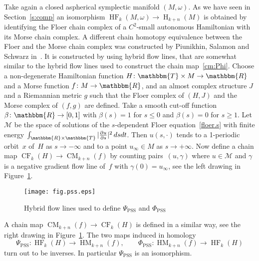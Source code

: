 \documentclass[12pt,twoside]{amsart}
\def\PSS{\scriptscriptstyle \operatorname{PSS}}
\theoremstyle{plain}
\numberwithin{figure}{section}
\numberwithin{equation}{section}
\def\H{\operatorname{H}}
\def\CM{\operatorname{CM}}
\def\HM{\operatorname{HM}}
\def\CF{\operatorname{CF}}
\def\HF{\operatorname{HF}}
\def\gg{\gamma}
\def\go{\omega}
\def\cm{{\mathcal M}}
\def\RR{\mathbbm{R}}
\def\TT{\mathbbm{T}}
\def\ni{\noindent}
\begin{document}
Take again a closed aspherical symplectic manifold $(M,\go)$.
As we have seen in Section~\ref{s:comp}
an isomorphism $\HF_k(M,\go) \to \H_{k+n}(M)$
is obtained by identifying the Floer chain complex of a $C^2$-small autonomous Hamiltonian
with its Morse chain complex.
A different chain homotopy equivalence between the Floer and the Morse chain complex
was constructed by Piunikhin, Salamon and Schwarz in~\cite{PiSaSch94}.
It is constructed by using hybrid flow lines, that are somewhat similar to the hybrid flow lines
used to construct the chain map~\eqref{cm:Phi}.
Choose a non-degenerate Hamiltonian function $H \colon \TT \times M \to \RR$ 
and a Morse function $f \colon M \to \RR$,
and an almost complex structure $J$ and a Riemannian metric $g$ such that the 
Floer complex of $(H,J)$ and the Morse complex of $(f,g)$ are defined.
Take a smooth cut-off function $\beta \colon \RR \to [0,1]$ with $\beta(s)=1$ for $s \leqslant 0$
and $\beta(s)=0$ for $s \geqslant 1$.
Let $\cm$ be the space of solutions of the $s$-dependent Floer equation~\eqref{floer.s} 
with finite energy $\int_{\RR \times \TT} |\frac{\partial u}{\partial s}|^2 \,ds dt$.
Then $u(s,\cdot)$ tends to a 1-periodic orbit~$x$ of~$H$ as $s \to -\infty$
and to a point $u_\infty \in M$ as $s \to +\infty$.
Now define a chain map $\CF_k(H) \to \CM_{k+n}(f)$ by counting pairs~$(u,\gg)$
where $u \in \cm$ and $\gg$ is a negative gradient flow line of~$f$ with $\gg(0) = u_\infty$,
see the left drawing in Figure~\ref{fig.pss}.


\begin{figure}[h]   
 \begin{center}
  \leavevmode\texttt{[image: fig.pss.eps]}
 \end{center}
 \caption{Hybrid flow lines used to define $\Psi_{\PSS}$ and $\Phi_{\PSS}$}  \label{fig.pss}
\end{figure}

\ni
A chain map $\CM_{k+n}(f) \to \CF_{k}(H)$ is defined in a similar way, see the right drawing 
in Figure~\ref{fig.pss}. 
The two maps induced in homology 
$$
\Psi_{\PSS} \colon \HF_k(H) \to \HM_{k+n}(f),  \qquad
\Phi_{\PSS} \colon \HM_{k+n}(f) \to \HF_k(H)
$$
turn out to be inverses. In particular $\Psi_{\PSS}$ is an isomorphism.
\end{document}
